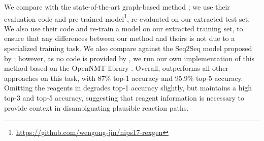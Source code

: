 We compare with the state-of-the-art graph-based method \cite{jin2017predicting};
we use their evaluation code and pre-trained model\footnote{\url{https://github.com/wengong-jin/nips17-rexgen}},
re-evaluated on our extracted test set. 
We also use their code and re-train a model on our extracted training set, to ensure that any differences between our method and theirs is not due to a specialized training task. We also compare against the Seq2Seq model proposed by \citep{schwaller2017found}; 
however, as no code is provided by \citet{schwaller2017found}, we run our own implementation of this method based on the OpenNMT library \citep{2017opennmt}.
Overall, \ourModelR outperforms all other approaches on this task, with 87\% top-1 accuracy and 95.9\% top-5 accuracy.
Omitting the reagents in \ourModelR degrades top-1 accuracy slightly, but maintains a high top-3 and top-5 accuracy,
suggesting that reagent information is necessary to provide context in disambiguating plausible reaction paths.







